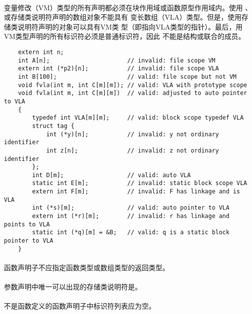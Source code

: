 {\paragraph{}
\ex 变量修改（VM）类型的所有声明都必须在块作用域或函数原型作用域内。使用
、或存储类说明符声明的数组对象不能具有
变长数组（VLA）类型。但是，使用存储类说明符声明的对象可以具有VM类
型（即指向VLA类型的指针）。最后，用VM类型声明的所有标识符必须是普通标识符，因此
不能是结构或联合的成员。
\begin{lstlisting}
    extern int n;
    int A[n];                      // invalid: file scope VM
    extern int (*p2)[n];           // invalid: file scope VLA
    int B[100];                    // valid: file scope but not VM
    void fvla(int m, int C[m][m]); // valid: VLA with prototype scope
    void fvla(int m, int C[m][m])  // valid: adjusted to auto pointer to VLA
    {
        typedef int VLA[m][m];     // valid: block scope typedef VLA
        struct tag {
            int (*y)[n];           // invalid: y not ordinary identifier
            int z[n];              // invalid: z not ordinary identifier
        };
        int D[m];                  // valid: auto VLA
        static int E[m];           // invalid: static block scope VLA
        extern int F[m];           // invalid: F has linkage and is VLA
        int (*s)[m];               // valid: auto pointer to VLA
        extern int (*r)[m];        // invalid: r has linkage and points to VLA
        static int (*q)[m] = &B;   // valid: q is a static block pointer to VLA
    }
\end{lstlisting}


\constraint
\paragraph{}
函数声明子不应指定函数类型或数组类型的返回类型。

\paragraph{}
参数声明中唯一可以出现的存储类说明符是。

\paragraph{}
不是函数定义的函数声明子中标识符列表应为空。

}
